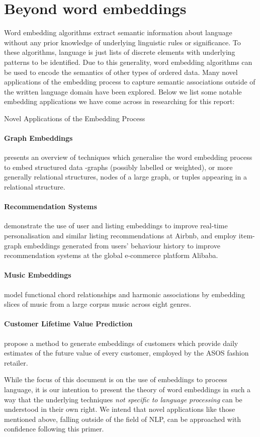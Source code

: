 \documentclass{ucetd}
\begin{document}
\section{Beyond word embeddings}
Word embedding algorithms extract semantic information about language without any prior knowledge of underlying linguistic rules or significance. To these algorithms, language is just lists of discrete elements with underlying patterns to be identified. Due to this generality, word embedding algorithms can be used to encode the semantics of other types of ordered data.
Many novel applications of the embedding process to capture semantic associations outside of the written language domain have been explored. Below we list some notable embedding applications we have come across in researching for this report:
\par
\begin{infobox}{Novel Applications of the Embedding Process}
  \paragraph{Graph Embeddings} \textcite{grohe20-word2-node2} presents an overview of techniques which generalise the word embedding process to embed structured data -graphs (possibly labelled or weighted), or more generally relational structures, nodes of a large graph, or tuples appearing in a relational structure.
  \paragraph{Recommendation Systems} \textcite{grbovic-2018-real-time-personalization} demonstrate the use of user and listing embeddings to improve real-time personalisation and similar listing recommendations at Airbnb, and \textcite{wang-2018-billion-scale-commodity-embedding} employ item-graph embeddings generated from users' behaviour history to improve recommendation systems at the global e-commerce platform Alibaba.
  \paragraph{Music Embeddings} \textcite{chuan-2018-from-context-to} model functional chord relationships and harmonic associations by embedding slices of music from a large corpus music across eight genres.
  \paragraph{Customer Lifetime Value Prediction} \textcite{chamberlain17-custom-lifet-value-predic-using-embed} propose a method to generate embeddings of customers which provide daily estimates of the future value of every customer, employed by the ASOS fashion retailer.
\end{infobox}
While the focus of this document is on the use of embeddings to process language, it is our intention to present the theory of word embeddings in such a way that the underlying techniques \emph{not specific to language processing} can be understood in their own right. We intend that novel applications like those mentioned above, falling outside of the field of NLP, can be approached with confidence following this primer.
\end{document}
